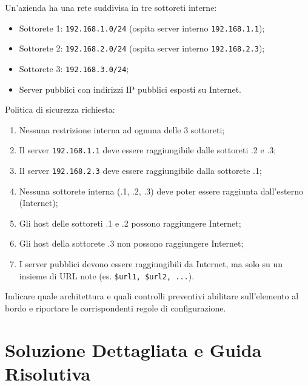 \documentclass[11pt,a4paper]{article}
\begin{document}
\begin{questionbox}
Un'azienda ha una rete suddivisa in tre sottoreti interne:
\begin{itemize}
    \item Sottorete 1: \texttt{192.168.1.0/24} (ospita server interno \texttt{192.168.1.1});
    \item Sottorete 2: \texttt{192.168.2.0/24} (ospita server interno \texttt{192.168.2.3});
    \item Sottorete 3: \texttt{192.168.3.0/24};
    \item Server pubblici con indirizzi IP pubblici esposti su Internet.
\end{itemize}
Politica di sicurezza richiesta:
\begin{enumerate}
    \item Nessuna restrizione interna ad ognuna delle 3 sottoreti;
    \item Il server \texttt{192.168.1.1} deve essere raggiungibile dalle sottoreti .2 e .3;
    \item Il server \texttt{192.168.2.3} deve essere raggiungibile dalla sottorete .1;
    \item Nessuna sottorete interna (.1, .2, .3) deve poter essere raggiunta dall'esterno (Internet);
    \item Gli host delle sottoreti .1 e .2 possono raggiungere Internet;
    \item Gli host della sottorete .3 non possono raggiungere Internet;
    \item I server pubblici devono essere raggiungibili da Internet, ma solo su un insieme di URL note (es. \texttt{\$url1, \$url2, ...}).
\end{enumerate}
Indicare quale architettura e quali controlli preventivi abilitare sull'elemento al bordo e riportare le corrispondenti regole di configurazione.
\end{questionbox}

\newpage
\section{Soluzione Dettagliata e Guida Risolutiva}
\end{document}
